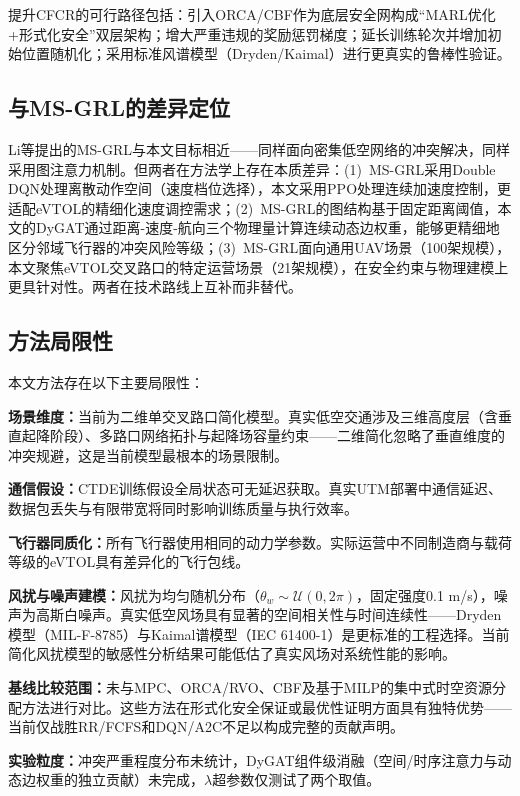 \documentclass[12pt,a4paper,UTF8]{ctexart}
\begin{document}
提升CFCR的可行路径包括：引入ORCA/CBF作为底层安全网构成``MARL优化+形式化安全''双层架构；增大严重违规的奖励惩罚梯度；延长训练轮次并增加初始位置随机化；采用标准风谱模型（Dryden/Kaimal）进行更真实的鲁棒性验证。

\subsection{与MS-GRL的差异定位}

Li等提出的MS-GRL\cite{ref24}与本文目标相近——同样面向密集低空网络的冲突解决，同样采用图注意力机制。但两者在方法学上存在本质差异：(1)~MS-GRL采用Double DQN处理离散动作空间（速度档位选择），本文采用PPO处理连续加速度控制，更适配eVTOL的精细化速度调控需求；(2)~MS-GRL的图结构基于固定距离阈值，本文的DyGAT通过距离-速度-航向三个物理量计算连续动态边权重，能够更精细地区分邻域飞行器的冲突风险等级；(3)~MS-GRL面向通用UAV场景（100架规模），本文聚焦eVTOL交叉路口的特定运营场景（21架规模），在安全约束与物理建模上更具针对性。两者在技术路线上互补而非替代。

\subsection{方法局限性}

本文方法存在以下主要局限性：

\textbf{场景维度：}当前为二维单交叉路口简化模型。真实低空交通涉及三维高度层（含垂直起降阶段）、多路口网络拓扑与起降场容量约束——二维简化忽略了垂直维度的冲突规避，这是当前模型最根本的场景限制。

\textbf{通信假设：}CTDE训练假设全局状态可无延迟获取。真实UTM部署中通信延迟、数据包丢失与有限带宽将同时影响训练质量与执行效率。

\textbf{飞行器同质化：}所有飞行器使用相同的动力学参数。实际运营中不同制造商与载荷等级的eVTOL具有差异化的飞行包线。

\textbf{风扰与噪声建模：}风扰为均匀随机分布（$\theta_w \sim \mathcal{U}(0, 2\pi)$，固定强度0.1 m/s），噪声为高斯白噪声。真实低空风场具有显著的空间相关性与时间连续性——Dryden模型（MIL-F-8785）与Kaimal谱模型（IEC 61400-1）是更标准的工程选择。当前简化风扰模型的敏感性分析结果可能低估了真实风场对系统性能的影响。

\textbf{基线比较范围：}未与MPC、ORCA/RVO\cite{ref22}、CBF\cite{ref23}及基于MILP的集中式时空资源分配方法进行对比。这些方法在形式化安全保证或最优性证明方面具有独特优势——当前仅战胜RR/FCFS和DQN/A2C不足以构成完整的贡献声明。

\textbf{实验粒度：}冲突严重程度分布未统计，DyGAT组件级消融（空间/时序注意力与动态边权重的独立贡献）未完成，$\lambda$超参数仅测试了两个取值。
\end{document}
